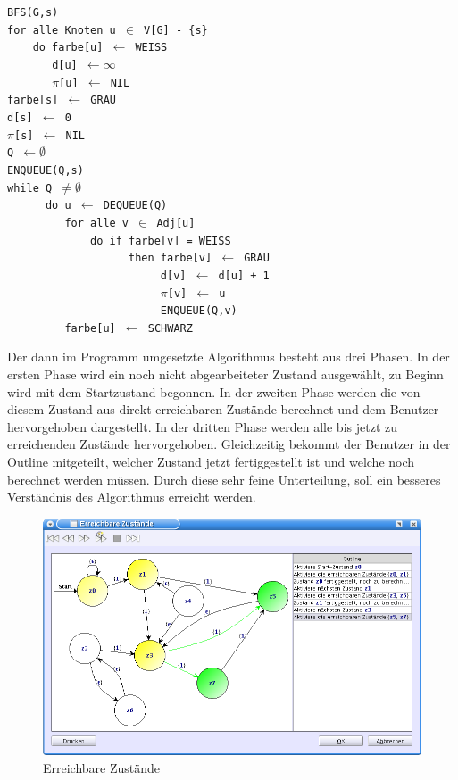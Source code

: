 \noindent
\verb|BFS(G,s)|\\
\verb|for alle Knoten u |$\in$\verb| V[G] - {s}|\\
\verb|    do farbe[u] |$\gets$\verb| WEISS|\\
\verb|       d[u] |$\gets \infty$\\
\verb|       |$\pi$\verb|[u] |$\gets$\verb| NIL|\\
\verb|farbe[s] |$\gets$\verb| GRAU|\\
\verb|d[s] |$\gets$\verb| 0|\\
\verb||$\pi$\verb|[s] |$\gets$\verb| NIL|\\
\verb|Q |$\gets \emptyset$\\
\verb|ENQUEUE(Q,s)|\\
\verb|while Q |$\neq \emptyset$\\
\verb|      do u |$\gets$\verb| DEQUEUE(Q)|\\
\verb|         for alle v |$\in$\verb| Adj[u]|\\
\verb|             do if farbe[v] = WEISS|\\
\verb|                   then farbe[v] |$\gets$\verb| GRAU|\\
\verb|                        d[v] |$\gets$\verb| d[u] + 1|\\
\verb|                        |$\pi$\verb|[v] |$\gets$\verb| u|\\
\verb|                        ENQUEUE(Q,v)|\\
\verb|         farbe[u] |$\gets$\verb| SCHWARZ|\\
\vspace{10pt}

Der dann im Programm umgesetzte Algorithmus besteht aus drei Phasen. In der
ersten Phase wird ein noch nicht abgearbeiteter Zustand ausgewählt, zu Beginn
wird mit dem Startzustand begonnen. In der zweiten Phase werden die von diesem
Zustand aus direkt erreichbaren Zustände berechnet und dem Benutzer hervorgehoben
dargestellt. In der dritten Phase werden alle bis jetzt zu erreichenden Zustände
hervorgehoben. Gleichzeitig bekommt der Benutzer in der Outline mitgeteilt,
welcher Zustand jetzt fertiggestellt ist und welche noch berechnet werden müssen.
Durch diese sehr feine Unterteilung, soll ein besseres Verständnis des
Algorithmus erreicht werden.\vspace{10pt}

\begin{figure}[h!]
\begin{center}
\includegraphics[width=12cm]{../images/reachable_states.png}
\caption{Erreichbare Zustände}
\end{center}
\end{figure}
\vspace{10pt}
